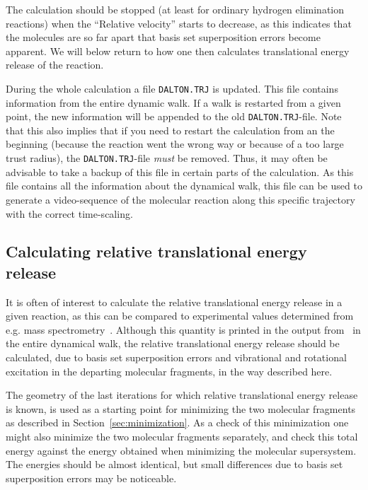 The calculation should be stopped (at least for ordinary hydrogen
elimination reactions) when the ``Relative velocity'' starts to
decrease, as this indicates that the molecules are so far apart that
basis set superposition errors
become apparent. We will below return to how
one then calculates translational energy release of the reaction.

During the whole calculation a file
\texttt{DALTON.TRJ} is updated. This
file contains information from the entire dynamic walk. If a
walk is restarted from a given point, the new information will be
appended to the old \texttt{DALTON.TRJ}-file. Note that this also implies
that if you need to restart the calculation from an the beginning
(because the reaction went the wrong way or because of a too large trust
radius), the
\texttt{DALTON.TRJ}-file {\em must} be removed. Thus, it may often be
advisable to take a backup of this file in certain parts of the
calculation. As this file contains all the information about the
dynamical walk, this file can be used to generate a video-sequence of
the molecular reaction along this specific trajectory with the correct
time-scaling.

\subsection{Calculating relative translational energy release}

It is often of interest to calculate the relative translational energy
release in a given reaction, as this can be compared to experimental
values determined from e.g. mass
spectrometry~\cite{theuhjajcpl173}. Although
this quantity
is printed in the output from \siraba\ in the entire dynamical walk, the
relative translational energy release should be calculated, due to
basis set superposition errors and
vibrational and rotational
excitation in the departing molecular
fragments, in the way described here.

The geometry of the last iterations for which relative translational
energy release is known, is used as a starting point for minimizing
the two molecular fragments as described in
Section~\ref{sec:minimization}. As a check of this minimization one
might also minimize the two molecular fragments separately, and check
this total energy against the energy obtained when minimizing the
molecular supersystem. The energies should be almost identical, but
small differences due to basis set superposition errors may be
noticeable.


